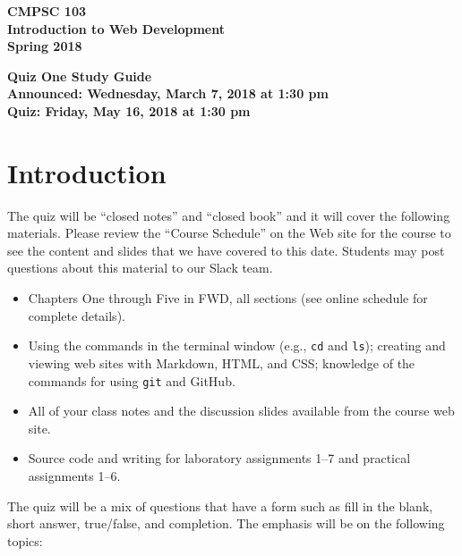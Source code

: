 \documentclass[11pt]{article}
\newcommand{\assignmentduedate}{May 16}
\newcommand{\assignmentassignedate}{March 7}
\newcommand{\assignmentnumber}{One}
\newcommand{\labyear}{2018}
\newcommand{\assignedday}{Wednesday}
\newcommand{\dueday}{Friday}
\newcommand{\labtime}{1:30 pm}
\newcommand{\assigneddate}{Announced: \assignedday, \assignmentassignedate, \labyear{} at \labtime{}}
\newcommand{\duedate}{Quiz: \dueday, \assignmentduedate, \labyear{} at \labtime{}}
\newcommand{\program}[1]{\lstinline{#1}}
\newcommand{\guidetitle}[1]
{
  \begin{center}
    \begin{center}
      \bf
      CMPSC 103\\Introduction to Web Development\\
      Spring 2018\\
      \medskip
    \end{center}
    \bf
    #1
  \end{center}
}
\begin{document}
\thispagestyle{empty}

\guidetitle{Quiz \assignmentnumber{} Study Guide \\ \assigneddate{} \\ \duedate{}}

\section*{Introduction}

\noindent
The quiz will be ``closed notes'' and ``closed book'' and it will cover the
following materials. Please review the ``Course Schedule'' on the Web site for
the course to see the content and slides that we have covered to this date.
Students may post questions about this material to our Slack team.

\begin{itemize}

  \itemsep 0in

  \item Chapters One through Five in FWD, all sections (see online schedule for
    complete details).

  \item Using the commands in the terminal window (e.g., \program{cd} and
    \program{ls}); creating and viewing web sites with Markdown, HTML, and CSS;
    knowledge of the commands for using \program{git} and GitHub.

  \item All of your class notes and the discussion slides available from the
    course web site.

  \item Source code and writing for laboratory assignments 1--7 and practical
    assignments 1--6.

\end{itemize}

\noindent The quiz will be a mix of questions that have a form such as fill in
the blank, short answer, true/false, and completion. The emphasis will be on the
following topics:
\end{document}
